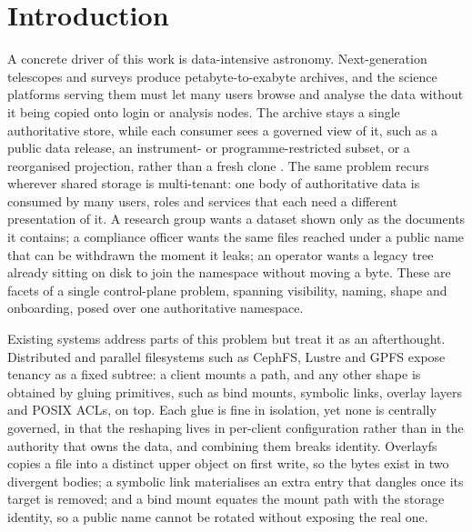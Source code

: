 \documentclass[numberedsection,acmtos]{acmart}
\begin{document}

\maketitle

\section{Introduction}
\label{sec:intro}
A concrete driver of this work is data-intensive astronomy. Next-generation
telescopes and surveys produce petabyte-to-exabyte archives, and the science
platforms serving them must let many users browse and analyse the data without
it being copied onto login or analysis nodes. The archive stays a single
authoritative store, while each consumer sees a governed view of it, such as a
public data release, an instrument- or programme-restricted subset, or a
reorganised projection, rather than a fresh clone \citep{han2026yourfs}. The
same problem recurs wherever shared storage is multi-tenant: one body of
authoritative data is consumed by many users, roles and services that each need
a different presentation of it. A research group wants a dataset shown only as
the documents it contains; a compliance officer wants the same files reached
under a public name that can be withdrawn the moment it leaks; an operator wants
a legacy tree already sitting on disk to join the namespace without moving a
byte. These are facets of a single control-plane problem, spanning visibility,
naming, shape and onboarding, posed over one authoritative namespace.

Existing systems address parts of this problem but treat it as an afterthought.
Distributed and parallel filesystems such as CephFS, Lustre and GPFS expose
tenancy as a fixed subtree: a client mounts a path, and any other shape is
obtained by gluing primitives, such as bind mounts, symbolic links, overlay
layers and POSIX ACLs, on top. Each glue is fine in isolation, yet none is
centrally governed, in that the reshaping lives in per-client configuration
rather than in the authority that owns the data, and combining them breaks
identity. Overlayfs copies a file into a distinct upper object on first write,
so the bytes exist in two divergent bodies; a symbolic link materialises an
extra entry that dangles once its target is removed; and a bind mount equates
the mount path with the storage identity, so a public name cannot be rotated
without exposing the real one.
\end{document}
